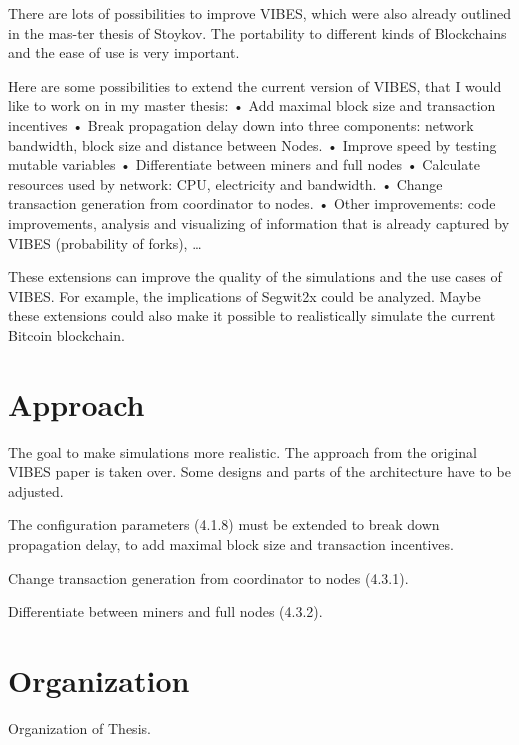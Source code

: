 There are lots of possibilities to improve VIBES, which were also already outlined in the mas-ter thesis of Stoykov. The portability to different kinds of Blockchains and the ease of use is very important.

Here are some possibilities to extend the current version of VIBES, that I would like to work on in my master thesis:
•	Add maximal block size and transaction incentives
•	Break propagation delay down into three components: network bandwidth, block size and distance between Nodes.
•	Improve speed by testing mutable variables
•	Differentiate between miners and full nodes
•	Calculate resources used by network: CPU, electricity and bandwidth.
•	Change transaction generation from coordinator to nodes.
•	Other improvements: code improvements, analysis and visualizing of information that is already captured by VIBES (probability of forks), …

These extensions can improve the quality of the simulations and the use cases of VIBES. For example, the implications of Segwit2x could be analyzed. Maybe these extensions could also make it possible to realistically simulate the current Bitcoin blockchain.

\section{Approach}
 \label{sec:approach}

The goal to make simulations more realistic. The approach from the original VIBES paper is taken over. Some designs and parts of the architecture have to be adjusted.

The configuration parameters (4.1.8) must be extended to break down propagation delay, to add maximal block size and transaction incentives.

Change transaction generation from coordinator to nodes (4.3.1).

Differentiate between miners and full nodes (4.3.2).

\section{Organization}
 \label{sec:organization}

Organization of Thesis.